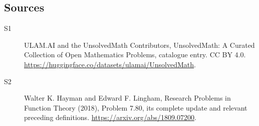 \documentclass[11pt]{article}
\begin{document}
\subsection{Sources}
\begin{description}
\item[\hypertarget{source:statement:1}{S1}] ULAM.AI and the UnsolvedMath Contributors, UnsolvedMath: A Curated Collection of Open Mathematics Problems, catalogue entry. CC BY 4.0. \url{https://huggingface.co/datasets/ulamai/UnsolvedMath}.
\item[\hypertarget{source:statement:2}{S2}] Walter K. Hayman and Edward F. Lingham, Research Problems in Function Theory (2018), Problem 7.80, its complete update and relevant preceding definitions. \url{https://arxiv.org/abs/1809.07200}.
\end{description}
\label{end:statement}
\end{document}
